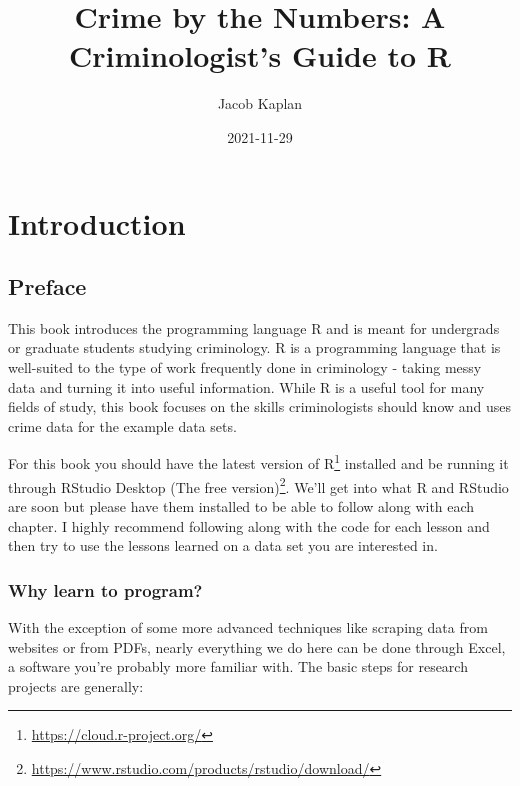 \documentclass[
]{krantz}
\title{Crime by the Numbers: A Criminologist's Guide to R}
\author{Jacob Kaplan}
\date{2021-11-29}
\renewcommand{\href}[2]{#2\footnote{\url{#1}}}
\begin{document}
\maketitle

{
\hypersetup{linkcolor=}
\setcounter{tocdepth}{2}
\tableofcontents
}
\mainmatter

\hypertarget{part-introduction}{%
\part{Introduction}\label{part-introduction}}

\hypertarget{preface}{%
\chapter{Preface}\label{preface}}

This book introduces the programming language R and is meant for undergrads or graduate students studying criminology. R is a programming language that is well-suited to the type of work frequently done in criminology - taking messy data and turning it into useful information. While R is a useful tool for many fields of study, this book focuses on the skills criminologists should know and uses crime data for the example data sets.

For this book you should have the latest version of \href{https://cloud.r-project.org/}{R} installed and be running it through \href{https://www.rstudio.com/products/rstudio/download/}{RStudio Desktop (The free version)}. We'll get into what R and RStudio are soon but please have them installed to be able to follow along with each chapter. I highly recommend following along with the code for each lesson and then try to use the lessons learned on a data set you are interested in.

\hypertarget{why-learn-to-program}{%
\section{Why learn to program?}\label{why-learn-to-program}}

With the exception of some more advanced techniques like scraping data from websites or from PDFs, nearly everything we do here can be done through Excel, a software you're probably more familiar with. The basic steps for research projects are generally:
\end{document}
